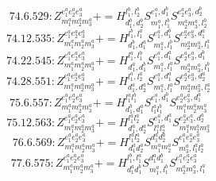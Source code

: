 \documentclass[letterpaper,10pt,fleqn,leqno,onecolumn]{article}
\begin{document}
\begin{equation} \;\;\;\;\;\;  74.6.529: Z^{e_{1}^{a}e_{2}^{a}e_{3}^{a}}_{m_{1}^{a}m_{2}^{a}m_{3}^{a}}+=H^{l_{1}^{b},l_{2}^{b}}_{d_{1}^{b},d_{2}^{b}}S^{e_{1}^{a},d_{1}^{b}}_{m_{1}^{a},l_{1}^{b}}S^{e_{2}^{a}e_{3}^{a},d_{2}^{b}}_{m_{2}^{a}m_{3}^{a},l_{2}^{b}} \end{equation}
\begin{equation} \;\;\;\;\;\;  74.12.535: Z^{e_{1}^{a}e_{2}^{a}e_{3}^{a}}_{m_{1}^{a}m_{2}^{a}m_{3}^{a}}+=H^{l_{1}^{b},l_{1}^{a}}_{d_{1}^{b},d_{1}^{a}}S^{e_{1}^{a},d_{1}^{b}}_{m_{1}^{a},l_{1}^{b}}S^{e_{2}^{a}e_{3}^{a},d_{1}^{a}}_{m_{2}^{a}m_{3}^{a},l_{1}^{a}} \end{equation}
\begin{equation} \;\;\;\;\;\;  74.22.545: Z^{e_{1}^{a}e_{2}^{a}e_{3}^{a}}_{m_{1}^{a}m_{2}^{a}m_{3}^{a}}+=H^{l_{1}^{a},l_{1}^{b}}_{d_{1}^{a},d_{1}^{b}}S^{e_{1}^{a},d_{1}^{a}}_{m_{1}^{a},l_{1}^{a}}S^{e_{2}^{a}e_{3}^{a},d_{1}^{b}}_{m_{2}^{a}m_{3}^{a},l_{1}^{b}} \end{equation}
\begin{equation} \;\;\;\;\;\;  74.28.551: Z^{e_{1}^{a}e_{2}^{a}e_{3}^{a}}_{m_{1}^{a}m_{2}^{a}m_{3}^{a}}+=H^{l_{1}^{a},l_{2}^{a}}_{d_{1}^{a},d_{2}^{a}}S^{e_{1}^{a},d_{1}^{a}}_{m_{1}^{a},l_{1}^{a}}S^{e_{2}^{a}e_{3}^{a},d_{2}^{a}}_{m_{2}^{a}m_{3}^{a},l_{2}^{a}} \end{equation}
\begin{equation} \;\;\;\;\;\;  75.6.557: Z^{e_{1}^{a}e_{2}^{a}e_{3}^{a}}_{m_{1}^{a}m_{2}^{a}m_{3}^{a}}+=H^{l_{1}^{a}l_{1}^{b}}_{d_{1}^{b},d_{1}^{a}}S^{e_{1}^{a},d_{1}^{b}}_{l_{1}^{a}l_{1}^{b}}S^{e_{2}^{a}e_{3}^{a},d_{1}^{a}}_{m_{1}^{a}m_{2}^{a}m_{3}^{a}} \end{equation}
\begin{equation} \;\;\;\;\;\;  75.12.563: Z^{e_{1}^{a}e_{2}^{a}e_{3}^{a}}_{m_{1}^{a}m_{2}^{a}m_{3}^{a}}+=H^{l_{1}^{a}l_{2}^{a}}_{d_{1}^{a},d_{2}^{a}}S^{e_{1}^{a},d_{1}^{a}}_{l_{1}^{a}l_{2}^{a}}S^{e_{2}^{a}e_{3}^{a},d_{2}^{a}}_{m_{1}^{a}m_{2}^{a}m_{3}^{a}} \end{equation}
\begin{equation} \;\;\;\;\;\;  76.6.569: Z^{e_{1}^{a}e_{2}^{a}e_{3}^{a}}_{m_{1}^{a}m_{2}^{a}m_{3}^{a}}+=H^{l_{1}^{a}l_{2}^{a}}_{d_{1}^{a}d_{2}^{a}}S^{d_{1}^{a}d_{2}^{a}}_{m_{1}^{a}m_{2}^{a}}S^{e_{1}^{a}e_{2}^{a}e_{3}^{a}}_{m_{3}^{a},l_{1}^{a}l_{2}^{a}} \end{equation}
\begin{equation} \;\;\;\;\;\;  77.6.575: Z^{e_{1}^{a}e_{2}^{a}e_{3}^{a}}_{m_{1}^{a}m_{2}^{a}m_{3}^{a}}+=H^{l_{1}^{b},l_{1}^{a}}_{d_{1}^{a}d_{1}^{b}}S^{d_{1}^{a}d_{1}^{b}}_{m_{1}^{a},l_{1}^{b}}S^{e_{1}^{a}e_{2}^{a}e_{3}^{a}}_{m_{2}^{a}m_{3}^{a},l_{1}^{a}} \end{equation}
\end{document}
